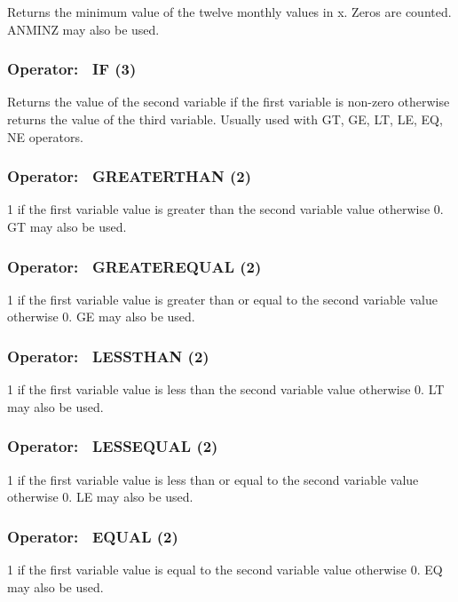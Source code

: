Returns the minimum value of the twelve monthly values in x. Zeros are counted. ANMINZ may also be used.

\subsubsection{Operator:~ IF (3)}\label{operator-if-3}

Returns the value of the second variable if the first variable is non-zero otherwise returns the value of the third variable. Usually used with GT, GE, LT, LE, EQ, NE operators.

\subsubsection{Operator:~ GREATERTHAN (2)}\label{operator-greaterthan-2}

1 if the first variable value is greater than the second variable value otherwise 0. GT may also be used.

\subsubsection{Operator:~ GREATEREQUAL (2)}\label{operator-greaterequal-2}

1 if the first variable value is greater than or equal to the second variable value otherwise 0. GE may also be used.

\subsubsection{Operator:~ LESSTHAN (2)}\label{operator-lessthan-2}

1 if the first variable value is less than the second variable value otherwise 0. LT may also be used.

\subsubsection{Operator:~ LESSEQUAL (2)}\label{operator-lessequal-2}

1 if the first variable value is less than or equal to the second variable value otherwise 0. LE may also be used.

\subsubsection{Operator:~ EQUAL (2)}\label{operator-equal-2}

1 if the first variable value is equal to the second variable value otherwise 0. EQ may also be used.

